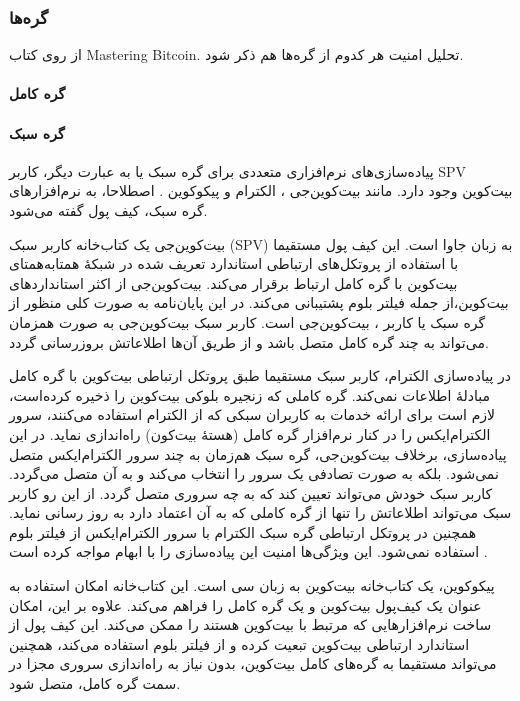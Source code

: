 \subsubsection{گره‌ها‌}
از روی کتاب Mastering Bitcoin.
تحلیل امنیت‌ هر کدوم از گره‌ها هم ذکر شود.
\paragraph{گره کامل}


\paragraph{گره سبک}

پیاده‌سازی‌های نرم‌افزاری متعددی برای گره سبک یا به عبارت دیگر، کاربر SPV بیت‌کوین وجود دارد. مانند بیت‌کوین‌جی \cite{bitcoinj}، الکترام  
\cite{Electrum}
و پیکوکوین
\cite{Garzik}. 
اصطلاحا، به نرم‌افزار‌های گره سبک، کیف پول گفته می‌شود.

بیت‌کوین‌جی یک کتاب‌خانه کاربر سبک (SPV) به زبان جاوا  است. این کیف پول مستقیما با استفاده از پروتکل‌های ارتباطی استاندارد تعریف شده در شبکهٔ همتا‌به‌همتای بیت‌کوین \cite{P2P_dev,P2P_ref} با گره کامل ارتباط برقرار می‌کند. بیت‌کوین‌جی از اکثر استاندارد‌های بیت‌کوین،‌از جمله فیلتر بلوم \cite{Hearn2013}  پشتیبانی می‌کند. در این پایان‌نامه به صورت کلی منظور از گره سبک یا کاربر ، بیت‌کوین‌جی است. کاربر سبک بیت‌کوین‌جی به صورت همزمان می‌تواند به چند گره کامل متصل باشد و از طریق آن‌ها اطلاعاتش بروزرسانی گردد.

در پیاده‌سازی الکترام،‌ کاربر سبک مستقیما طبق پروتکل ارتباطی بیت‌کوین با گره کامل مبادلهٔ اطلاعات نمی‌کند. گره کاملی که زنجیره بلوکی بیت‌کوین را ذخیره کرده‌است،‌ لازم است برای ارائه خدمات به کاربران سبکی که از الکترام استفاده می‌کنند،‌ سرور 
الکترام‌ایکس
\cite{ElectrumX}
را در کنار نرم‌افزار گره کامل (هسته‌ٔ بیت‌کون) راه‌اندازی نماید. در این پیاده‌سازی، برخلاف بیت‌کوین‌جی، گره سبک هم‌زمان به چند سرور الکترام‌ایکس متصل نمی‌شود. بلکه به صورت تصادفی یک سرور را انتخاب می‌کند و به آن متصل می‌گردد. کاربر سبک خودش می‌تواند تعیین کند که به چه سروری متصل گردد. از این رو کاربر سبک می‌تواند اطلاعاتش را تنها از گره کاملی که به آن اعتماد دارد به روز رسانی نماید.  همچنین در پروتکل ارتباطی گره سبک الکترام با سرور الکترام‌ایکس از فیلتر بلوم استفاده نمی‌شود. این ویژگی‌ها امنیت این پیاده‌سازی را با ابهام مواجه کرده است \cite{Alison2014}. 

پیکوکوین،‌ یک کتاب‌خانه بیت‌کوین به زبان سی است. این کتاب‌خانه امکان استفاده به عنوان یک کیف‌پول بیت‌کوین و یک گره کامل را فراهم می‌کند. علاوه بر این، امکان ساخت نرم‌افزارهایی که مرتبط با بیت‌کوین هستند را ممکن می‌کند. این کیف پول از استاندارد ارتباطی بیت‌کوین تبعیت کرده و از فیلتر بلوم استفاده می‌کند، همچنین می‌تواند مستقیما به گره‌های کامل بیت‌کوین، بدون نیاز به راه‌اندازی سروری مجزا در سمت گره کامل، متصل شود.

